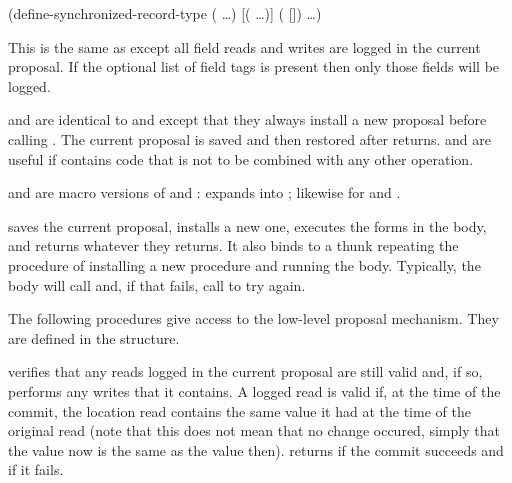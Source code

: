 \begin{example}
(define-synchronized-record-type  
  (  \ldots)
  [(\cvar {} \ldots)]
  (  [])
  \ldots)
\end{example}
This is the same as 
 except all field reads and
 writes are logged in the current proposal.
If the optional list of field tags is present then only those fields will
 be logged.

\begin{protos}
\end{protos}
\noindent
{} and  are identical
 to  and  except that they
 always install a new proposal before calling .
The current proposal is saved and then restored after  returns.
 and  are useful if  contains
 code that is not to be combined with any other operation.

 and  are macro versions of
 and :
 expands into
; likewise for
 and .


\begin{protos}
\end{protos}

 saves the current proposal, installs a new
one, executes the forms in the body, and returns whatever they
returns.  It also binds  to a thunk repeating the
procedure of installing a new procedure and running the body.
Typically, the body will call  and, if that fails,
call  to try again.

The following procedures give access to the low-level proposal
mechanism.  They are defined in the  structure.
\begin{protos}
\end{protos}
\noindent
{} verifies that any reads logged in the current proposal are
 still valid and, if so, performs any writes that it contains.
A logged read is valid if, at the time of the commit, the location read contains
 the same value it had at the time of the original read (note that this does
 not mean that no change occured, simply that the value now is the same as
 the value then).
 returns  if the commit succeeds and 
 if it fails.

